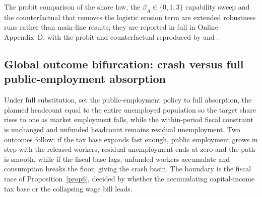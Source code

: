 \documentclass[review,12pt]{elsarticle}
\theoremstyle{plain}
\theoremstyle{definition}
\theoremstyle{remark}
\begin{document}
The probit comparison of the share law, the $\beta_A\in\{0,1,3\}$ capability sweep and the counterfactual that removes the logistic erosion term are extended robustness runs rather than main-line results; they are reported in full in Online Appendix~D, with the probit and counterfactual reproduced by  and .

\subsection{Global outcome bifurcation: crash versus full public-employment absorption}
Under full substitution, set the public-employment policy to full absorption, the planned headcount equal to the entire unemployed population so the target share rises to one as market employment falls, while the within-period fiscal constraint is unchanged and unfunded headcount remains residual unemployment. Two outcomes follow: if the tax base expands fast enough, public employment grows in step with the released workers, residual unemployment ends at zero and the path is smooth, while if the fiscal base lags, unfunded workers accumulate and consumption breaks the floor, giving the crash basin. The boundary is the fiscal race of Proposition~\ref{prop6}, decided by whether the accumulating capital-income tax base or the collapsing wage bill leads.
\end{document}
